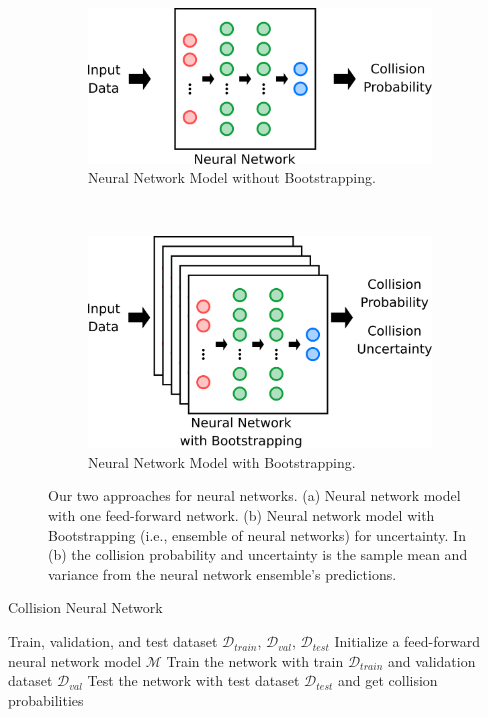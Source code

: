 \begin{figure}[t]
	\begin{subfigure}[t]{1\linewidth}
		\centering
		\includegraphics[width=0.95\linewidth]{figures/nn.pdf}
		\caption{Neural Network Model without Bootstrapping.}
		\label{fig:nn-without-bootstrap}
	\end{subfigure}
    \\
    \par\bigskip
	\begin{subfigure}[t]{1\linewidth}
		\centering
		\includegraphics[width=0.95\linewidth]{figures/nn_bootstrap.pdf}
		\caption{Neural Network Model with Bootstrapping.}
		\label{fig:nn-with-bootstrap}
	\end{subfigure}
	\caption{Our two approaches for neural networks. (a) Neural network model with one feed-forward network. (b) Neural network model with Bootstrapping (i.e., ensemble of neural networks) for uncertainty. In (b) the collision probability and uncertainty is the sample mean and variance from the neural network ensemble's predictions.}
	\label{fig:nn-overview}
\end{figure}

\begin{algorithm}[t]
	\caption{Collision Neural Network}
	\label{alg:nn-without-bootstrapping}
	\begin{algorithmic}[1]
	    \Require Train, validation, and test dataset $\mathcal{D}_{train}$, $\mathcal{D}_{val}$, $\mathcal{D}_{test}$
	    \State Initialize a feed-forward neural network model $\mathcal{M}$
	    \State Train the network with train $\mathcal{D}_{train}$ and validation dataset $\mathcal{D}_{val}$
	    \State Test the network with test dataset $\mathcal{D}_{test}$ and get collision probabilities
	\end{algorithmic}
\end{algorithm}


